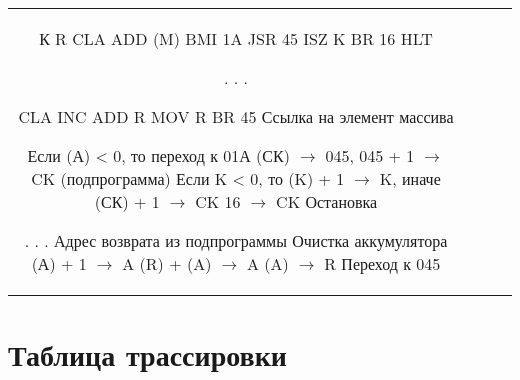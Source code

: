 \documentclass[a4paper,14pt]{article}
\begin{document}
\begin{tabular}{|c|c|l|l|}
К
R
CLA
ADD (M)
BMI 1A
JSR 45
ISZ K
BR 16
HLT

. . .

CLA
INC
ADD R
MOV R
BR 45	Ссылка на элемент массива



Если (А) < 0, то переход к 01А
(СК) $\to$ 045, 045 + 1 $\to$ CK (подпрограмма)
Если K < 0, то (K) + 1 $\to$ K, иначе (СК) + 1 $\to$ CK
16 $\to$ CK
Остановка

. . .
Адрес возврата из подпрограммы
Очистка аккумулятора
(А) + 1 $\to$ A
(R) + (A) $\to$ A
(A) $\to$ R
Переход к 045

\hline
\end{tabular}

\section{Таблица трассировки}
\end{document}
